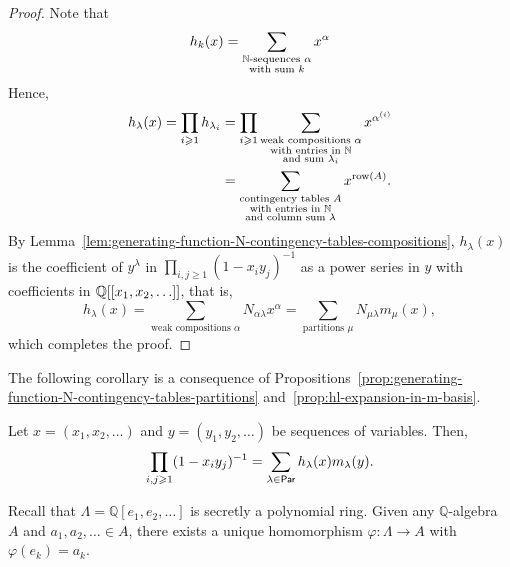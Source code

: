 \begin{proof}
	Note that 
	\begin{equation}
		h_k(x)
		= \sum_{\substack{\mathbb{N}\text{-sequences } \alpha \\ \text{with sum } k}}
			x^\alpha
	\end{equation}
	Hence,
	\begin{align}
		h_\lambda(x)
		= \prod_{i\geqslant 1} h_{\lambda_i}
		&= \prod_{i\geqslant 1}
			\sum_{\substack{\text{weak compositions } \alpha \\ \text{with entries in } \mathbb{N} \\ \text{and sum } \lambda_i}}
				x^{\alpha^{(i)}} \\
		&= \sum_{\substack{\text{contingency tables } A \\ \text{with entries in } \mathbb{N} \\ \text{and column sum } \lambda}}
			x^{\operatorname{row}(A)}.
	\end{align}
	By Lemma~\ref{lem:generating-function-N-contingency-tables-compositions},
	\(h_\lambda(x)\) is the coefficient of \(y^\lambda\) in \(\prod_{i, j \geq 1} (1 - x_iy_j)^{-1}\) as a power series in \(y\) with coefficients in \(\mathbb{Q}[[x_1, x_2, \ldots]]\),
	that is,
	\begin{equation}
		h_\lambda(x) = \sum_{\text{weak compositions } \alpha} N_{\alpha\lambda} x^\alpha = \sum_{\text{partitions } \mu} N_{\mu\lambda} m_\mu(x),
	\end{equation}
	which completes the proof.
\end{proof}

The following corollary is a consequence of Propositions~\ref{prop:generating-function-N-contingency-tables-partitions} and~\ref{prop:hl-expansion-in-m-basis}.

\begin{corollary}
	Let \(x = (x_1, x_2, \ldots)\) and \(y = (y_1, y_2, \ldots)\) be sequences of variables.
	Then,
	\begin{equation}
		\prod_{i, j \geqslant 1} (1 - x_iy_j)^{-1} = \sum_{\lambda \in \operatorname{\mathsf{Par}}} h_\lambda(x) m_\lambda(y).
	\end{equation}
\end{corollary}

Recall that \(\Lambda = \mathbb{Q}[e_1, e_2, \ldots]\) is secretly a polynomial ring. Given any \(\mathbb{Q}\)-algebra \(A\) and \(a_1, a_2, \ldots \in A\), there exists a unique homomorphism \(\varphi: \Lambda \to A\) with \(\varphi(e_k) = a_k\).


